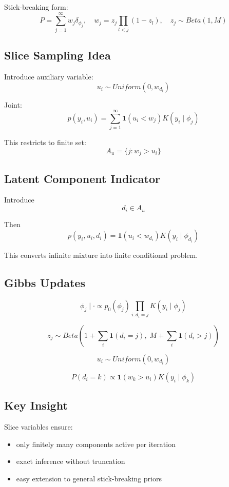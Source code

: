 \documentclass[12pt,oneside]{book}
\numberwithin{equation}{section}
\theoremstyle{definition}
\theoremstyle{plain}
\theoremstyle{remark}
\begin{document}
Stick-breaking form:
\[
P = \sum_{j=1}^\infty w_j \delta_{\phi_j}, \quad w_j = z_j \prod_{l<j}(1-z_l), \quad z_j \sim Beta(1,M)
\]

\subsection*{Slice Sampling Idea}

Introduce auxiliary variable:
\[
u_i \sim Uniform(0, w_{d_i})
\]

Joint:
\[
p(y_i, u_i) = \sum_{j=1}^\infty \mathbf{1}(u_i < w_j) K(y_i \mid \phi_j)
\]

This restricts to finite set:
\[
A_u = \{j: w_j > u_i\}
\]

\subsection*{Latent Component Indicator}

Introduce
\[
d_i \in A_u
\]

Then
\[
p(y_i, u_i, d_i) = \mathbf{1}(u_i < w_{d_i}) K(y_i \mid \phi_{d_i})
\]

This converts infinite mixture into finite conditional problem.

\subsection*{Gibbs Updates}

\[
\phi_j \mid \cdot \propto p_0(\phi_j)\prod_{i:d_i=j} K(y_i \mid \phi_j)
\]

\[
z_j \sim Beta\left(1 + \sum_i \mathbf{1}(d_i=j),\; M + \sum_i \mathbf{1}(d_i > j)\right)
\]

\[
u_i \sim Uniform(0, w_{d_i})
\]

\[
P(d_i = k) \propto \mathbf{1}(w_k > u_i) K(y_i \mid \phi_k)
\]

\subsection*{Key Insight}

Slice variables ensure:

\begin{itemize}
\item only finitely many components active per iteration
\item exact inference without truncation
\item easy extension to general stick-breaking priors
\end{itemize}
\end{document}
